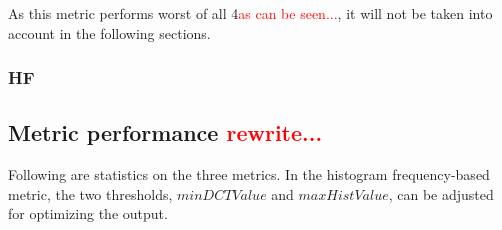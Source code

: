 As this metric performs worst of all 4\textcolor{red}{as can be seen...}, it will not be taken into account in the following sections.


\subsubsection{HF}

\subsection{Metric performance \textcolor{red}{rewrite...}}
Following are statistics on the three metrics.
In the histogram frequency-based metric, the two thresholds, $minDCTValue$ and $maxHistValue$, can be adjusted for optimizing the output.

